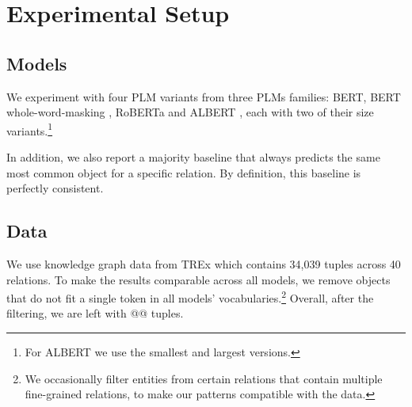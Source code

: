 \section{Experimental Setup}
\label{sec:setup}

\subsection{Models}
We experiment with four PLM variants from three PLMs families: BERT, BERT whole-word-masking \cite{bert}, RoBERTa \cite{roberta} and ALBERT \cite{albert}, each with two of their  size variants.\footnote{For ALBERT we use the smallest and largest versions.}

In addition, we also report a majority baseline that always predicts the same most common object for a specific relation. By definition, this baseline is perfectly consistent.

\subsection{Data}



We use knowledge graph data from TREx \cite{trex} which contains 34,039 tuples across 40 relations. To make the results comparable across all models, we remove objects that do not fit a single token in all models' vocabularies.\footnote{We occasionally filter entities from certain relations that contain multiple fine-grained relations, to make our patterns compatible with the data.}
Overall, after the filtering, we are left with @@ tuples.


